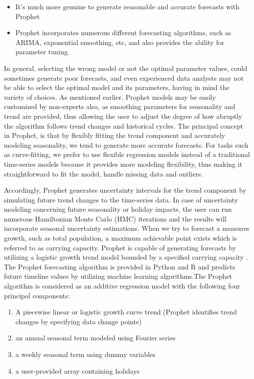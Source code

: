 \begin{itemize}
    \item It's much more genuine to generate reasonable and accurate forecasts with Prophet
    \item Prophet incorporates numerous different forecasting algorithms, such as ARIMA, exponential smoothing, etc, and also provides the ability for parameter tuning.
\end{itemize}
In general, selecting the wrong model or not the optimal parameter values, could sometimes generate poor forecasts, and even experienced data analysts may not be able to select the optimal model and its parameters, having in mind the variety of choices. As mentioned earlier, Prophet models may be easily customized by non-experts also, as smoothing parameters for seasonality and trend are provided, thus allowing the user to adjust the degree of how abruptly the algorithm follows trend changes and historical cycles. The principal concept in Prophet, is that by flexibly fitting the trend component and accurately modeling seasonality, we tend to generate more accurate forecasts. For tasks such as curve-fitting, we prefer to use flexible regression models instead of a traditional time-series models because it provides more modeling flexibility, thus making it straightforward to fit the model, handle missing data and outliers.
\par Accordingly, Prophet generates uncertainty intervals for the trend component by simulating future trend changes to the time-series data. In case of uncertainty modeling concerning future seasonality or holiday impacts, the user can run numerous Hamiltonian Monte Carlo (HMC) iterations and the results will incorporate seasonal uncertainty estimations. When we try to forecast a measures growth, such as total population, a maximum achievable point exists which is referred to as carrying capacity. Prophet is capable of generating forecasts by utilizing a logistic growth trend model bounded by a specified carrying capacity \cite{tyralis2018large}. The Prophet forecasting algorithm is provided in Python and R and predicts future timeline values by utilizing machine learning algorithms.The Prophet algorithm is considered as an additive regression model with the following four principal components: 
\begin{enumerate}
    \item A piecewise linear or logistic growth curve trend (Prophet identifies trend changes by specifying data change points)
    \item an annual seasonal term modeled using Fourier series
    \item a weekly seasonal term using dummy variables
    \item a user-provided array containing holidays 
\end{enumerate} 
